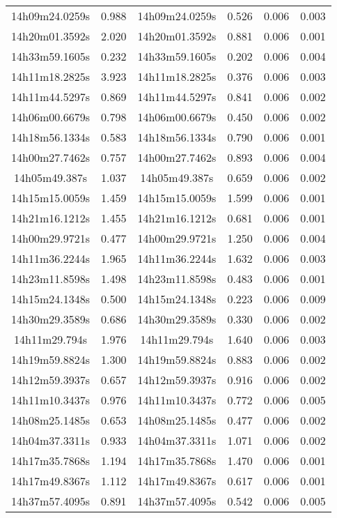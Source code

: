 \begin{table}
\begin{tabular}{cccccc}
14h09m24.0259s & 0.988 & 14h09m24.0259s & 0.526 & 0.006 & 0.003 \\
14h20m01.3592s & 2.020 & 14h20m01.3592s & 0.881 & 0.006 & 0.001 \\
14h33m59.1605s & 0.232 & 14h33m59.1605s & 0.202 & 0.006 & 0.004 \\
14h11m18.2825s & 3.923 & 14h11m18.2825s & 0.376 & 0.006 & 0.003 \\
14h11m44.5297s & 0.869 & 14h11m44.5297s & 0.841 & 0.006 & 0.002 \\
14h06m00.6679s & 0.798 & 14h06m00.6679s & 0.450 & 0.006 & 0.002 \\
14h18m56.1334s & 0.583 & 14h18m56.1334s & 0.790 & 0.006 & 0.001 \\
14h00m27.7462s & 0.757 & 14h00m27.7462s & 0.893 & 0.006 & 0.004 \\
14h05m49.387s & 1.037 & 14h05m49.387s & 0.659 & 0.006 & 0.002 \\
14h15m15.0059s & 1.459 & 14h15m15.0059s & 1.599 & 0.006 & 0.001 \\
14h21m16.1212s & 1.455 & 14h21m16.1212s & 0.681 & 0.006 & 0.001 \\
14h00m29.9721s & 0.477 & 14h00m29.9721s & 1.250 & 0.006 & 0.004 \\
14h11m36.2244s & 1.965 & 14h11m36.2244s & 1.632 & 0.006 & 0.003 \\
14h23m11.8598s & 1.498 & 14h23m11.8598s & 0.483 & 0.006 & 0.001 \\
14h15m24.1348s & 0.500 & 14h15m24.1348s & 0.223 & 0.006 & 0.009 \\
14h30m29.3589s & 0.686 & 14h30m29.3589s & 0.330 & 0.006 & 0.002 \\
14h11m29.794s & 1.976 & 14h11m29.794s & 1.640 & 0.006 & 0.003 \\
14h19m59.8824s & 1.300 & 14h19m59.8824s & 0.883 & 0.006 & 0.002 \\
14h12m59.3937s & 0.657 & 14h12m59.3937s & 0.916 & 0.006 & 0.002 \\
14h11m10.3437s & 0.976 & 14h11m10.3437s & 0.772 & 0.006 & 0.005 \\
14h08m25.1485s & 0.653 & 14h08m25.1485s & 0.477 & 0.006 & 0.002 \\
14h04m37.3311s & 0.933 & 14h04m37.3311s & 1.071 & 0.006 & 0.002 \\
14h17m35.7868s & 1.194 & 14h17m35.7868s & 1.470 & 0.006 & 0.001 \\
14h17m49.8367s & 1.112 & 14h17m49.8367s & 0.617 & 0.006 & 0.001 \\
14h37m57.4095s & 0.891 & 14h37m57.4095s & 0.542 & 0.006 & 0.005 \\

\end{tabular}
\end{table}

